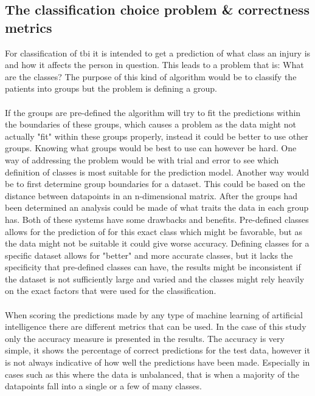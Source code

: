 \documentclass[11pt]{article}
\begin{document}
\subsection{The classification choice problem \& correctness metrics}
For classification of \gls{tbi} it is intended to get a prediction of what class an injury is and how it affects the person in question. This leads to a problem that is: What are the classes? The purpose of this kind of algorithm would be to classify the patients into groups but the problem is defining a group.\\
\\
If the groups are pre-defined the algorithm will try to fit the predictions within the boundaries of these groups, which causes a problem as the data might not actually "fit" within these groups properly, instead it could be better to use other groups. Knowing what groups would be best to use can however be hard. One way of addressing the problem would be with trial and error to see which definition of classes is most suitable for the prediction model. Another way would be to first determine group boundaries for a dataset. This could be based on the distance between datapoints in an n-dimensional matrix. After the groups had been determined an analysis could be made of what traits the data in each group has. Both of these systems have some drawbacks and benefits. Pre-defined classes allows for the prediction of for this exact class which might be favorable, but as the data might not be suitable it could give worse accuracy. Defining classes for a specific dataset allows for "better" and more accurate classes, but it lacks the specificity that pre-defined classes can have, the results might be inconsistent if the dataset is not sufficiently large and varied and the classes might rely heavily on the exact factors that were used for the classification.\\
\\
When scoring the predictions made by any type of machine learning of artificial intelligence there are different metrics that can be used. In the case of this study only the accuracy measure is presented in the results. The accuracy is very simple, it shows the percentage of correct predictions for the test data, however it is not always indicative of how well the predictions have been made. Especially in cases such as this where the data is unbalanced, that is when a majority of the datapoints fall into a single or a few of many classes.\\
\\
\end{document}
